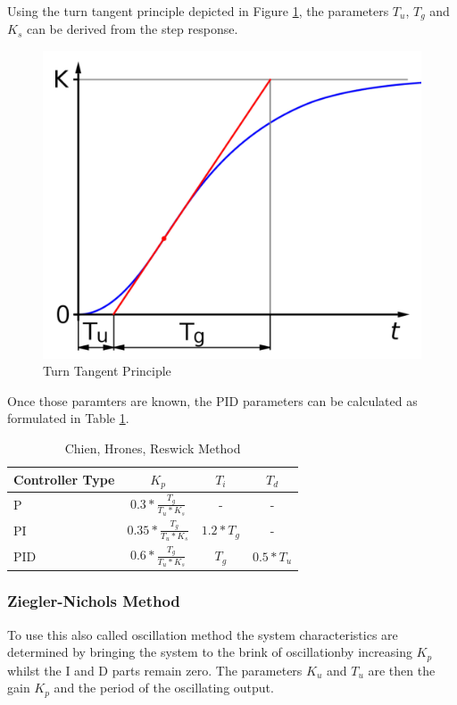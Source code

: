 Using the turn tangent principle depicted in Figure \ref{fig:wendetangentenverfahren}, the parameters $T_u$, $T_g$ and $K_s$ can be derived from the step response.

\begin{figure}[H]
\begin{center}
\includegraphics[width=0.5\linewidth]{images/general/wendetangentenverfahren}
\end{center}
\caption{Turn Tangent Principle}
\label{fig:wendetangentenverfahren}
\end{figure}

Once those paramters are known, the PID parameters can be calculated as formulated in Table \ref{tab:chien}.

\begin{table}[H]
\begin{center}
\begin{tabular}{ l | c | c | c}
  Controller Type & $K_p$ & $T_i$ & $T_d$\\
  \hline
  \hline
  P & $0.3 * \frac{T_g}{T_u * K_s}$& - & -\\
  \hline
  PI & $0.35 * \frac{T_g}{T_u * K_s}$ & $1.2 * T_g$ & - \\
  \hline
  PID & $0.6 * \frac{T_g}{T_u * K_s}$ & $T_g$ & $0.5 * T_u$\\
  \hline
\end{tabular}
\end{center}
\caption{Chien, Hrones, Reswick Method}
\label{tab:chien}
\end{table}

\subsubsection{Ziegler-Nichols Method}
\label{subs:Ziegler-Nichols}

To use this also called oscillation method the system characteristics are determined by bringing the system to the brink of oscillationby increasing $K_p$ whilst the I and D parts remain zero. The parameters $K_u$ and $T_u$ are then the gain $K_p$ and the period of the oscillating output.


